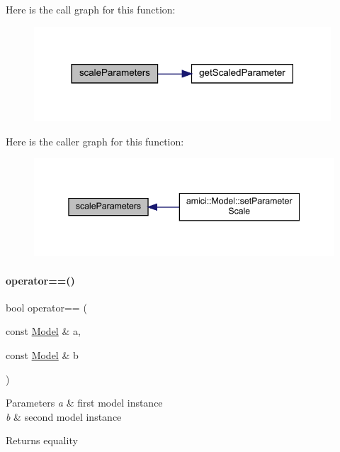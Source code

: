 Here is the call graph for this function\+:
\nopagebreak
\begin{figure}[H]
\begin{center}
\leavevmode
\includegraphics[width=314pt]{namespaceamici_a28b22fcad5ed463795858b60952587cd_cgraph}
\end{center}
\end{figure}
Here is the caller graph for this function\+:
\nopagebreak
\begin{figure}[H]
\begin{center}
\leavevmode
\includegraphics[width=345pt]{namespaceamici_a28b22fcad5ed463795858b60952587cd_icgraph}
\end{center}
\end{figure}
\mbox{\label{namespaceamici_ad5a9ae5abc63d6c24c64506c0f9aed6d}} 
\paragraph{\texorpdfstring{operator==()}{operator==()}\hspace{0.1cm}{\footnotesize\ttfamily [1/2]}}
{\footnotesize\ttfamily bool operator== (\begin{DoxyParamCaption}\item[{const \mbox{\hyperlink{classamici_1_1_model}{Model}} \&}]{a,  }\item[{const \mbox{\hyperlink{classamici_1_1_model}{Model}} \&}]{b }\end{DoxyParamCaption})}


\begin{DoxyParams}{Parameters}
{\em a} & first model instance \\
\hline
{\em b} & second model instance \\
\hline
\end{DoxyParams}
\begin{DoxyReturn}{Returns}
equality 
\end{DoxyReturn}


